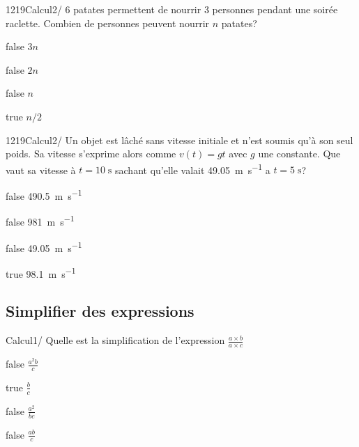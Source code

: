 \documentclass[11pt]{article}
\begin{document}
            \begin{question}{1219}{Calcul}{2}{/}
            	6 patates permettent de nourrir 3 personnes pendant une soirée raclette. Combien de personnes peuvent nourrir $n$ patates?
            \end{question}

            \begin{reponses}
            	\item[false] $3n$
            	\item[false] $2n$
                \item[false] $n$
                \item[true] $n/2$
            \end{reponses}
        	
            \begin{question}{1219}{Calcul}{2}{/}
            	Un objet est lâché sans vitesse initiale et n'est soumis qu'à son seul poids. Sa vitesse s'exprime alors comme $v(t)=gt$ avec $g$ une constante. Que vaut sa vitesse à $t=10\;\si{\second}$ sachant qu'elle valait \SI{49,05}{\meter\per\second} a $t=5\;\si{\second}$?
            \end{question}

            \begin{reponses}
            	\item[false] \SI{490,5}{\meter\per\second}
            	\item[false] \SI{981}{\meter\per\second}
                \item[false] \SI{49,05}{\meter\per\second}
                \item[true] \SI{98,1}{\meter\per\second}
            \end{reponses}
        
        \subsection{Simplifier des expressions}
        
        	\begin{question}{9}{Calcul}{1}{/}
				Quelle est la simplification de l'expression $\frac{a \times b}{a \times c}$
            \end{question}

            \begin{reponses}
            	\item[false] $\frac{a^2b}{c}$
            	\item[true] $\frac{b}{c}$
                \item[false] $\frac{a^2}{bc}$
                \item[false] $\frac{ab}{c}$
            \end{reponses}
        
\end{document}
